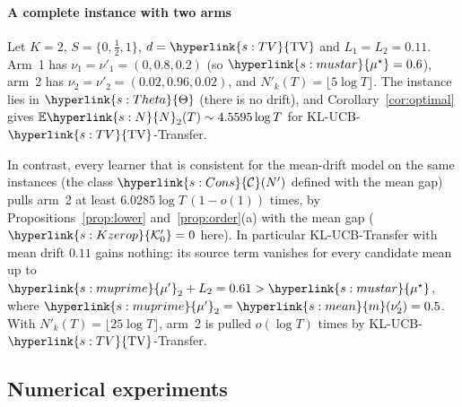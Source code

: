 \documentclass[11pt]{article}
\newcommand{\E}{\mathbb{E}}
\newcommand{\sy}[2]{{\hyperlink{#1}{#2}}}
\newcommand{\mean}{\sy{s:mean}{m}}
\newcommand{\TV}{\sy{s:TV}{\mathrm{TV}}}
\newcommand{\mus}{\sy{s:mustar}{\mu^{\star}}}
\newcommand{\mkp}{\sy{s:muprime}{\mu'}}
\newcommand{\Nc}{\sy{s:N}{N}}
\newcommand{\Thet}{\sy{s:Theta}{\Theta}}
\newcommand{\Cons}{\sy{s:Cons}{\mathcal{C}}}
\newcommand{\Kop}{\sy{s:Kzerop}{\mathcal{K}'_{0}}}
\begin{document}
\paragraph{A complete instance with two arms} Let $K=2$, $S=\{0,\frac12,1\}$, $d=\TV$ and
$L_1=L_2=0.11$. Arm~1 has $\nu_1=\nu'_1=(0,0.8,0.2)$ (so $\mus=0.6$), arm~2 has
$\nu_2=\nu'_2=(0.02,0.96,0.02)$, and $N'_k(T)=\lfloor5\log T\rfloor$. The instance lies in $\Thet$
(there is no drift), and Corollary~\ref{cor:optimal} gives $\E \Nc_2(T)\sim4.5595\log T$ for
KL-UCB-$\TV$-Transfer.

In contrast, every learner that is consistent for the mean-drift model on the same instances (the
class $\Cons(N')$ defined with the mean gap) pulls arm~2 at least $6.0285\log T\,(1-o(1))$ times, by
Propositions~\ref{prop:lower} and~\ref{prop:order}(a) with the mean gap ($\Kop=0$ here). In
particular KL-UCB-Transfer \citep{PMRM26} with mean drift $0.11$ gains nothing: its source term
vanishes for every candidate mean up to $\mkp_2+L_2=0.61>\mus$, where $\mkp_2=\mean(\nu'_2)=0.5$.
With $N'_k(T)=\lfloor25\log T\rfloor$, arm~2 is pulled $o(\log T)$ times by KL-UCB-$\TV$-Transfer.

\subsection{Numerical experiments}\label{sec:experiments}
\end{document}
